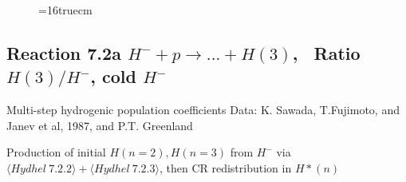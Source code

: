 \documentclass[12pt,dvipdfmx]{article}
\begin{document}
\begin{small}
\begin{verbatim}
\end{verbatim}\end{small}
\begin{figure} \label{2.2.15e}
\epsfxsize=16truecm
\end{figure}
\newpage






\subsection{
Reaction 7.2a $ H^- + p \rightarrow ...+ H(3) $, \   Ratio $H(3)/H^- $, cold $H^-$
}
Multi-step hydrogenic population coefficients
 Data: K. Sawada, T.Fujimoto, \cite{kn:Sawada} and Janev et al, 1987, and P.T. Greenland

Production of initial $H(n=2), H(n=3)$ from $H^-$ via $ \langle Hydhel~ 7.2.2\rangle + \langle Hydhel~ 7.2.3\rangle$,
 then CR redistribution in $H*(n)$
\end{document}
